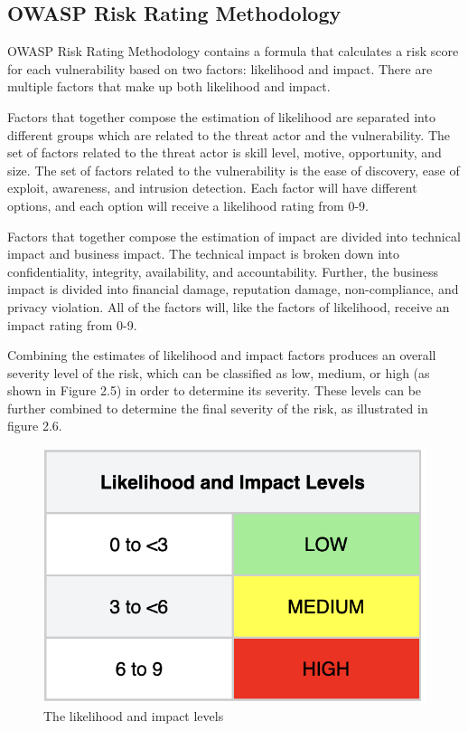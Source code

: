 \subsection{OWASP Risk Rating Methodology}
OWASP Risk Rating Methodology contains a formula that calculates a risk score for each vulnerability based on two factors: likelihood and impact. There are multiple factors that make up both likelihood and impact. 
 
Factors that together compose the estimation of likelihood are separated into different groups which are related to the threat actor and the vulnerability. The set of factors related to the threat actor is skill level, motive, opportunity, and size. The set of factors related to the vulnerability is the ease of discovery, ease of exploit, awareness, and intrusion detection. Each factor will have different options, and each option will receive a likelihood rating from 0-9. 

Factors that together compose the estimation of impact are divided into technical impact and business impact. The technical impact is broken down into confidentiality, integrity, availability, and accountability. Further, the business impact is divided into financial damage, reputation damage, non-compliance, and privacy violation. All of the factors will, like the factors of likelihood, receive an impact rating from 0-9. 

Combining the estimates of likelihood and impact factors produces an overall severity level of the risk, which can be classified as low, medium, or high (as shown in Figure 2.5) in order to determine its severity. These levels can be further combined to determine the final severity of the risk, as illustrated in figure 2.6.\cite{owasprisk}

\begin{figure}[H]
    \centering
    \includegraphics[scale=0.5]{Images/OWASP-likelihood.png}
    \caption{The likelihood and impact levels}
    \label{fig: Impact levels}
\end{figure}

